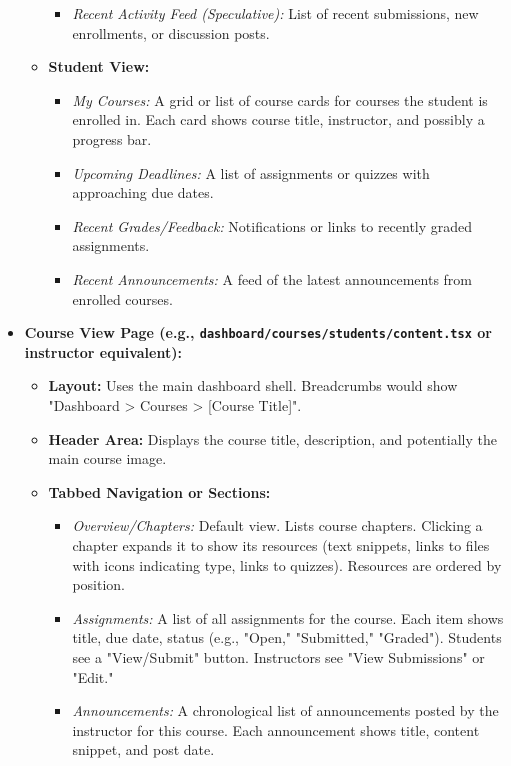 \documentclass[12pt,a4paper]{article}
\begin{document}
\begin{itemize}
\begin{itemize}
\begin{itemize}
            \item \textit{Recent Activity Feed (Speculative):} List of recent submissions, new enrollments, or discussion posts.
        \end{itemize}
        \item \textbf{Student View:}
        \begin{itemize}
            \item \textit{My Courses:} A grid or list of course cards for courses the student is enrolled in. Each card shows course title, instructor, and possibly a progress bar.
            \item \textit{Upcoming Deadlines:} A list of assignments or quizzes with approaching due dates.
            \item \textit{Recent Grades/Feedback:} Notifications or links to recently graded assignments.
            \item \textit{Recent Announcements:} A feed of the latest announcements from enrolled courses.
        \end{itemize}
    \end{itemize}
    \item \textbf{Course View Page (e.g., \texttt{dashboard/courses/students/content.tsx} or instructor equivalent):}
    \begin{itemize}
        \item \textbf{Layout:} Uses the main dashboard shell. Breadcrumbs would show "Dashboard > Courses > [Course Title]".
        \item \textbf{Header Area:} Displays the course title, description, and potentially the main course image.
        \item \textbf{Tabbed Navigation or Sections:}
        \begin{itemize}
            \item \textit{Overview/Chapters:} Default view. Lists course chapters. Clicking a chapter expands it to show its resources (text snippets, links to files with icons indicating type, links to quizzes). Resources are ordered by position.
            \item \textit{Assignments:} A list of all assignments for the course. Each item shows title, due date, status (e.g., "Open," "Submitted," "Graded"). Students see a "View/Submit" button. Instructors see "View Submissions" or "Edit."
            \item \textit{Announcements:} A chronological list of announcements posted by the instructor for this course. Each announcement shows title, content snippet, and post date.

\end{itemize}
\end{itemize}
\end{itemize}
\end{document}
